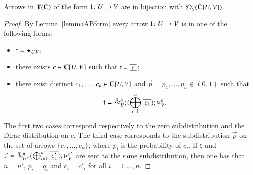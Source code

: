 \begin{lemma}\label{lemma: arrows A-B subdistributions}
    Arrows in $\mathbf{T}(\mathbf{C})$ of the form $\mathfrak{t}\colon U\to V$ are in bijection with $\mathcal{D}_{\le}(\mathbf{C}[U,V])$.
\end{lemma}
\begin{proof}
    By Lemma~\ref{lemmaABform} every arrow $\mathfrak{t}\colon U\to V$ is in one of the following forms:
\begin{itemize}
\item $\mathfrak{t}=\star_{U,V}$;
\item there exists $c \in \mathbf{C}[U,V]$ such that $\t=\tapeFunct{c}$;
\item there exist distinct $c_1, \dots, c_n \in \mathbf{C}[U,V]$ and $\vec{p}=p_1, \dots, p_{n}\in(0,1)$ such that 
\[\t=\,\diagpn{\vec{p}\;}{U}{n}
;  (\bigoplus_{i=1}^n  \tapeFunct{c_i})  ; \codiag{V}^n\text{.}\]
\end{itemize}
The first two cases correspond respectively to the zero subdistribution and the Dirac distribution on $c$. The third case corresponds to the subdistribution $\vec{p}$ on the set of arrows $\{c_1, \dots, c_n\}$, where $p_i$ is the probability of $c_i$. %
 If $\mathfrak{t}$ and $\t'=\, \diagpn{\vec{q}\;}{U}{n}; (\bigoplus_{i=1}^{n'}  \tapeFunct{c'_i}) ; \codiag{V}^{n'}$ are sent to the same subdistribution, then one has that $n=n'$, $p_i=q_i$ and $c_i=c'_i$ for all $i=1,\dots,n$. 
\end{proof}

